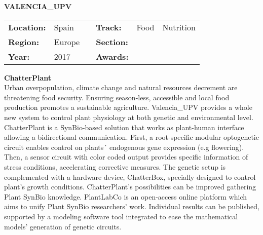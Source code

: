 \textbf{\uppercase{Valencia\_UPV}}
\FloatBarrier
\begin{table}[h]
\begin{tabular}{lp{2.5cm}llll}
\textbf{Location:} & Spain & \multicolumn{1}{|l}{} & \textbf{Track:}   & Food & Nutrition \\
\textbf{Region:}   & Europe   & \multicolumn{1}{|l}{} & \textbf{Section:} &  \\
\textbf{Year:}     & 2017   & \multicolumn{1}{|l}{} & \textbf{Awards:}  &
\end{tabular}
\end{table}
\FloatBarrier
\noindent	\textbf{ChatterPlant} \vspace{.2cm}\\
Urban overpopulation, climate change and natural resources decrement are threatening food security. Ensuring season-less, accessible and local food production promotes a sustainable agriculture. Valencia\_UPV provides a whole new system to control plant physiology at both genetic and environmental level.
ChatterPlant is a SynBio-based solution that works as plant-human interface allowing a bidirectional communication. First, a root-specific modular optogenetic circuit enables control on plants´ endogenous gene expression (e.g flowering). Then, a sensor circuit with color coded output provides specific information of stress conditions, accelerating corrective measures. The genetic setup is complemented with a hardware device, ChatterBox, specially designed to control plant’s growth conditions.
ChatterPlant’s possibilities can be improved gathering Plant SynBio knowledge. PlantLabCo is an open-access online platform which aims to unify Plant SynBio researchers’ work. Individual results can be published, supported by a modeling software tool integrated to ease the mathematical models’ generation of genetic circuits.
\vspace{2cm}



